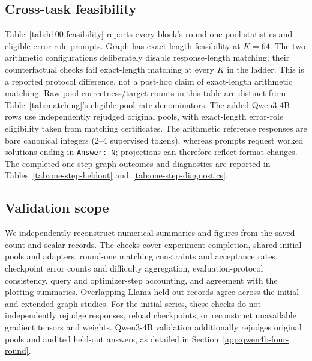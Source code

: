 \subsection{Cross-task feasibility}
Table~\ref{tab:h100-feasibility} reports every block's round-one
pool statistics and eligible error-role prompts. Graph has exact-length
feasibility at $K=64$. The two arithmetic configurations deliberately
disable response-length matching; their counterfactual checks
fail exact-length matching at every $K$ in the ladder. This is a reported
protocol difference, not a post-hoc claim of exact-length arithmetic matching.
Raw-pool correctness/target counts in this table are distinct from
Table~\ref{tab:matching}'s eligible-pool rate denominators.
The added Qwen3-4B rows use independently rejudged original pools, with
exact-length error-role eligibility taken from matching certificates.
The arithmetic reference responses are bare canonical
integers (2--4 supervised tokens), whereas prompts request worked solutions
ending in \texttt{Answer: N}; projections can therefore reflect format changes.
The completed one-step graph outcomes and diagnostics are reported in
Tables~\ref{tab:one-step-heldout} and~\ref{tab:one-step-diagnostics}.



\subsection{Validation scope}
We independently reconstruct numerical summaries and figures from the
saved count and scalar records. The checks cover experiment completion,
shared initial pools and adapters, round-one matching constraints and
acceptance rates, checkpoint error counts and difficulty aggregation,
evaluation-protocol consistency, query and optimizer-step accounting,
and agreement with the plotting summaries. Overlapping Llama held-out
records agree across the initial and extended graph studies.
For the initial series, these checks do not independently rejudge responses,
reload checkpoints, or reconstruct unavailable gradient tensors and weights.
Qwen3-4B validation additionally rejudges original pools and audited held-out
answers, as detailed in Section~\ref{app:qwen4b-four-round}.


